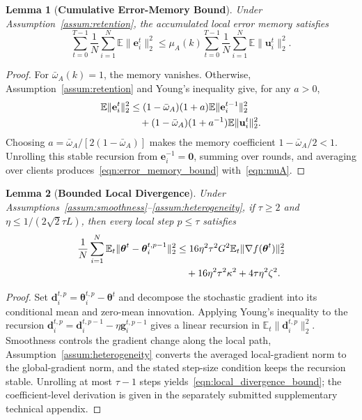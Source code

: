\documentclass[journal]{IEEEtran}
\newenvironment{revisionblock}{\begingroup\color{revisionred}}{\endgroup}
\newtheorem{lemma}{Lemma}
\begin{document}
\begin{revisionblock}
\begin{lemma}[\bf Cumulative Error-Memory Bound]
\label{lemma:memory_dr}
Under Assumption~\ref{assum:retention}, the accumulated local error memory satisfies
{
\begin{equation}
    \sum_{t=0}^{T-1}\frac1N\sum_{i=1}^{N}
    \mathbb{E}\|\mathbf{e}_i^t\|_2^2
    \le
    \mu_A(k)
    \sum_{t=0}^{T-1}\frac1N\sum_{i=1}^{N}
    \mathbb{E}\|\mathbf{u}_i^t\|_2^2.
    \label{eqn:error_memory_bound}
\end{equation}
}
\end{lemma}
\begin{proof}
For $\bar{\omega}_A(k)=1$, the memory vanishes. Otherwise, Assumption~\ref{assum:retention} and Young's inequality give, for any $a>0$,
{
\begin{align}
	\mathbb{E}\|\mathbf{e}_i^t\|_2^2
	&\le(1-\bar{\omega}_A)(1+a)
	\mathbb{E}\|\mathbf{e}_i^{t-1}\|_2^2
	\notag\\
	&\quad+(1-\bar{\omega}_A)(1+a^{-1})
	\mathbb{E}\|\mathbf{u}_i^t\|_2^2.
\end{align}
}
Choosing $a=\bar{\omega}_A/[2(1-\bar{\omega}_A)]$ makes the memory coefficient $1-\bar{\omega}_A/2<1$. Unrolling this stable recursion from $\mathbf{e}_i^{-1}=\mathbf{0}$, summing over rounds, and averaging over clients produces~\eqref{eqn:error_memory_bound} with~\eqref{eqn:muA}.
\end{proof}

\begin{lemma}[\bf Bounded Local Divergence]
\label{lemma:local_div_main}
Under Assumptions~\ref{assum:smoothness}--\ref{assum:heterogeneity}, if $\tau\ge2$ and $\eta\le1/(2\sqrt{2}\tau L)$, then every local step $p\le\tau$ satisfies
{
\begin{align}
	\frac1N\sum_{i=1}^{N}
	\mathbb{E}_t\|\boldsymbol{\theta}^t-\boldsymbol{\theta}_i^{t,p-1}\|_2^2
	&\le16\eta^2\tau^2G^2
	\mathbb{E}_t\|\nabla f(\boldsymbol{\theta}^t)\|_2^2
	\notag\\
	&\quad+16\eta^2\tau^2\kappa^2+4\tau\eta^2\zeta^2.
	\label{eqn:local_divergence_bound}
\end{align}
}
\end{lemma}
\begin{proof}
Set $\mathbf{d}_i^{t,p}=\boldsymbol{\theta}_i^{t,p}-\boldsymbol{\theta}^t$ and decompose the stochastic gradient into its conditional mean and zero-mean innovation. Applying Young's inequality to the recursion $\mathbf{d}_i^{t,p}=\mathbf{d}_i^{t,p-1}-\eta\mathbf{g}_i^{t,p-1}$ gives a linear recursion in $\mathbb{E}_t\|\mathbf{d}_i^{t,p}\|_2^2$. Smoothness controls the gradient change along the local path, Assumption~\ref{assum:heterogeneity} converts the averaged local-gradient norm to the global-gradient norm, and the stated step-size condition keeps the recursion stable. Unrolling at most $\tau-1$ steps yields~\eqref{eqn:local_divergence_bound}; the coefficient-level derivation is given in the separately submitted supplementary technical appendix.
\end{proof}


\end{revisionblock}
\end{document}
